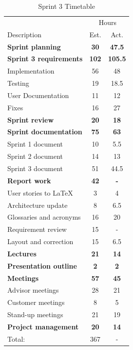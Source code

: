 \begin{table}[!htb] \small \center
\caption{Sprint 3 Timetable\label{tab:sprint3time}}
\begin{tabularx}{\textwidth}{X c c}
	\toprule
	& \multicolumn{2}{c}{Hours} \\
	\cmidrule(r){2-3}
	Description & Est. & Act. \\
	\midrule
	\textbf{Sprint planning} & \textbf{30} & \textbf{47.5} \\
	\addlinespace
	\textbf{Sprint 3 requirements} & \textbf{102} & \textbf{105.5} \\
	Implementation & 56 & 48 \\
	Testing & 19 & 18.5 \\
	User Documentation & 11 & 12 \\
	Fixes & 16 & 27 \\
	\addlinespace
	\textbf{Sprint review} & \textbf{20} & \textbf{18} \\
	\addlinespace
	\textbf{Sprint documentation} & \textbf{75} & \textbf{63} \\
	Sprint 1 document & 10 & 5.5\\
	Sprint 2 document & 14 & 13 \\
	Sprint 3 document & 51 & 44.5 \\
	\addlinespace
	\textbf{Report work} & \textbf{42} & \textbf{-} \\
	User stories to LaTeX & 3 & 4\\
	Architecture update & 8 & 6.5\\
	Glossaries and acronyms & 16 & 20\\
	Requirement review & 15 & -\\
	Layout and correction & 15 & 6.5 \\
	\addlinespace
	\textbf{Lectures} & \textbf{21} & \textbf{14} \\
	\addlinespace
	\textbf{Presentation outline} & \textbf{2} & \textbf{2} \\
	\addlinespace
	\textbf{Meetings} & \textbf{57} & \textbf{45} \\
	Advisor meetings & 28 & 21 \\
	Customer meetings & 8 & 5 \\
	Stand-up meetings & 21 & 19 \\
	\textbf{Project management} & \textbf{20} & \textbf{14} \\
	\midrule
	Total: & 367 & - \\
	\bottomrule
\end{tabularx}
\end{table}



